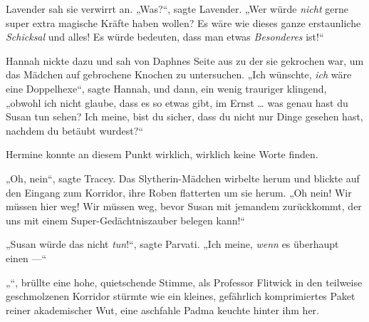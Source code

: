 Lavender sah sie verwirrt an.
„Was?“, sagte Lavender.
„Wer würde \emph{nicht} gerne super extra magische Kräfte haben wollen? Es wäre wie dieses ganze erstaunliche \emph{Schicksal} und alles! Es würde bedeuten, dass man etwas \emph{Besonderes} ist!“

Hannah nickte dazu und sah von Daphnes Seite aus zu der sie gekrochen war, um das Mädchen auf gebrochene Knochen zu untersuchen.
„Ich wünschte, \emph{ich} wäre eine Doppelhexe“, sagte Hannah, und dann, ein wenig trauriger klingend, „obwohl ich nicht glaube, dass es so etwas gibt, im Ernst … was genau hast du Susan tun sehen? Ich meine, bist du sicher, dass du nicht nur Dinge gesehen hast, nachdem du betäubt wurdest?“

Hermine konnte an diesem Punkt wirklich, wirklich keine Worte finden.

„Oh, nein“, sagte Tracey. Das Slytherin-Mädchen wirbelte herum und blickte auf den Eingang zum Korridor, ihre Roben flatterten um sie herum.
„Oh nein! Wir müssen hier weg! Wir müssen weg, bevor Susan mit jemandem zurückkommt, der uns mit einem Super-Gedächtniszauber belegen kann!“

„Susan würde das nicht \emph{tun}!“, sagte Parvati.
„Ich meine, \emph{wenn} es überhaupt einen —“

„“, brüllte eine hohe, quietschende Stimme, als Professor Flitwick in den teilweise geschmolzenen Korridor stürmte wie ein kleines, gefährlich komprimiertes Paket reiner akademischer Wut, eine aschfahle Padma keuchte hinter ihm her.

